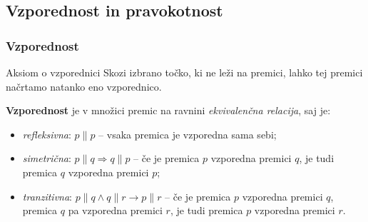 
    \subsection{Vzporednost in pravokotnost}

        \begin{frame}
            \frametitle{Vzporednost}
            
            \begin{alertblock}{Aksiom o vzporednici}
                Skozi izbrano točko, ki ne leži na premici, lahko tej premici načrtamo natanko eno vzporednico.

                \begin{figure}[H]

                \end{figure}

            \end{alertblock}

            \begin{block}{}
                \textbf{Vzporednost} je v množici premic na ravnini \textit{ekvivalenčna relacija}, saj je:
                \begin{itemize}
                    \item \textit{refleksivna}: $p\parallel p$ -- vsaka premica je vzporedna sama sebi;
                    \item \textit{simetrična}: $p\parallel q \Rightarrow q\parallel p$ -- če je premica $p$ vzporedna premici $q$, je tudi premica $q$ vzporedna premici $p$;
                    \item \textit{tranzitivna}: $p\parallel q \land q \parallel r \rightarrow p \parallel r$ -- če je premica $p$ vzporedna premici $q$, premica $q$ pa vzporedna premici $r$, 
                        je tudi premica $p$ vzporedna premici $r$.
                \end{itemize}
            \end{block}

        \end{frame}

